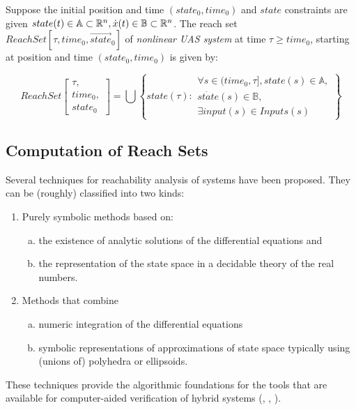     \begin{definition}
        Suppose the initial position and time $(state_0, time_0)$ and $state$ constraints are given $state(t) \in \mathbb{A} \subset \mathbb{R}^n, \dot{x}(t) \in \mathbb{B} \subset \mathbb{R}^n$. The reach set $ReachSet[\tau, time_0, \vec{state}_0]$ of \emph{nonlinear UAS system} at time $\tau \ge time_0$, starting at position and time $(state_0, time_0)$ is given by:
        
        \begin{equation}
            ReachSet\left[\begin{gathered}\tau,\\ time_0,\\ state_0\end{gathered}\right] = \bigcup 
            \left\{
                state(\tau):
                \begin{gathered}
                    \forall s\in (time_0,\tau], state(s) \in \mathbb{A},\\ 
                    \dot{state}(s) \in \mathbb{B},\\ 
                    \exists input(s) \in Inputs(s)
                \end{gathered}
            \right\}
        \end{equation}
        
    \end{definition}


    \subsection{Computation of Reach Sets}\label{sec:ReachSetComputationMethodsASIS}
    \noindent   Several techniques for reachability analysis of systems have been proposed. They can be (roughly) classified into two kinds:
    
    \begin{enumerate}
    \item Purely symbolic methods based on: 
        \begin{enumerate}[a.]
        \item the existence of analytic solutions of the differential equations and 
    
        \item the representation of the state space in a decidable theory of the real numbers.
        \end{enumerate}
    \item Methods that combine 
    \begin{enumerate}[a.]
        \item numeric integration of the differential equations
    
        \item symbolic representations of approximations of state space typically using (unions of) polyhedra or ellipsoids.
        \end{enumerate}
    \end{enumerate}
    These techniques provide the algorithmic foundations for the tools that are available for computer-aided verification of hybrid systems (\cite{daws1996tool}, \cite{henzinger1994symbolic}, \cite{henzinger1995hytech}).

